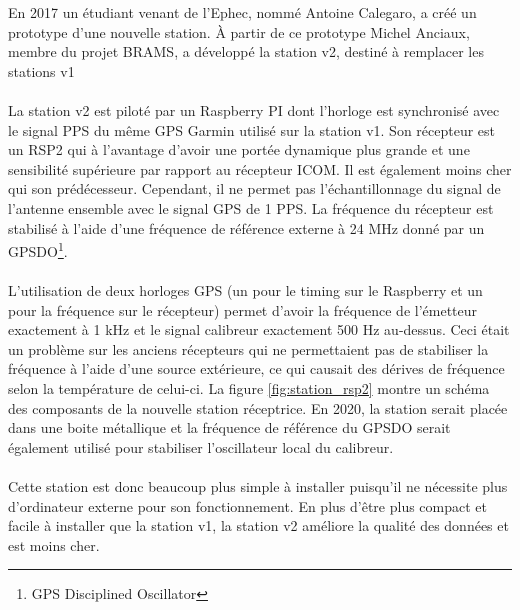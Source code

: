 \documentclass[11pt]{article}
\begin{document}
En 2017 un étudiant venant de l'Ephec, nommé Antoine Calegaro, a créé un prototype d'une nouvelle station.
À partir de ce prototype Michel Anciaux, membre du projet BRAMS, a développé la station v2, destiné à remplacer les stations v1\\
\\
La station v2 est piloté par un Raspberry PI dont l'horloge est synchronisé avec le signal PPS du même GPS Garmin utilisé sur la station v1.
Son récepteur est un RSP2 qui à l'avantage d'avoir une portée dynamique plus grande et une sensibilité supérieure par rapport au récepteur ICOM.
Il est également moins cher qui son prédécesseur.
Cependant, il ne permet pas l'échantillonnage du signal de l'antenne ensemble avec le signal GPS de 1 PPS.
La fréquence du récepteur est stabilisé à l'aide d'une fréquence de référence externe à 24 MHz donné par un GPSDO\footnote{GPS Disciplined Oscillator}.\\
\\
L'utilisation de deux horloges GPS (un pour le timing sur le Raspberry et un pour la fréquence sur le récepteur) permet d'avoir la fréquence de l'émetteur exactement à 1 kHz et le signal calibreur exactement 500 Hz au-dessus.
Ceci était un problème sur les anciens récepteurs qui ne permettaient pas de stabiliser la fréquence à l'aide d'une source extérieure, ce qui causait des dérives de fréquence selon la température de celui-ci.
La figure \ref{fig:station_rsp2} montre un schéma des composants de la nouvelle station réceptrice.
En 2020, la station serait placée dans une boite métallique et la fréquence de référence du GPSDO serait également utilisé pour stabiliser l'oscillateur local du calibreur.\\
\\
Cette station est donc beaucoup plus simple à installer puisqu'il ne nécessite plus d'ordinateur externe pour son fonctionnement.
En plus d'être plus compact et facile à installer que la station v1, la station v2 améliore la qualité des données et est moins cher.


\end{document}
